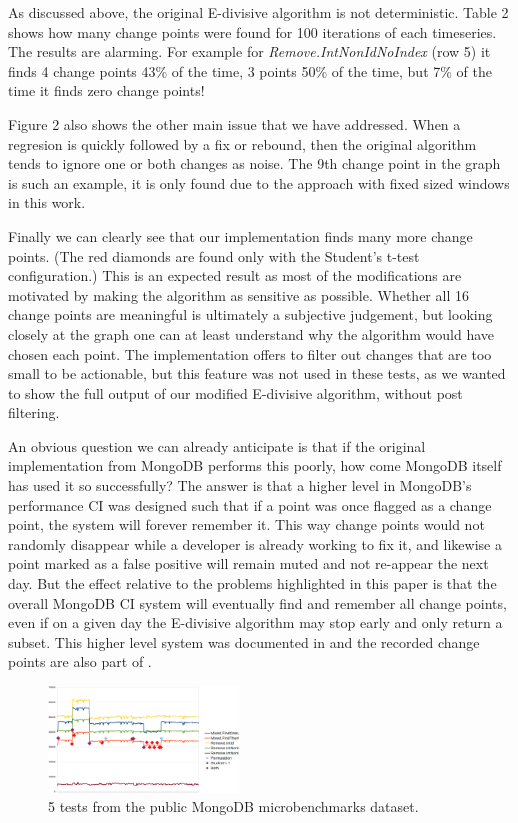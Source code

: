\documentclass[sigconf]{acmart}
\begin{document}
As discussed above, the original E-divisive algorithm is not deterministic. Table 2 shows how many
change points were found for 100 iterations of each timeseries. The results are alarming. For example
for \emph{Remove.IntNonIdNoIndex} (row 5) it finds 4 change points 43\% of the time, 3 points 50\%
of the time, but 7\% of the time it finds zero change points!

Figure 2 also shows the other main issue that we have addressed. When a regresion is quickly followed
by a fix or rebound, then the original algorithm tends to ignore one or both changes as noise. The
9th change point in the graph is such an example, it is only found due to the approach with fixed sized
windows in this work.

Finally we can clearly see that our implementation finds many more change points. (The red diamonds
are found only with the Student's t-test configuration.) This is an expected
result as most of the modifications are motivated by making the algorithm as sensitive as possible.
Whether all 16 change points are meaningful is ultimately a subjective judgement, but looking closely
at the graph one can at least understand why the algorithm would have chosen each point. The implementation
offers to filter out changes that are too small to be actionable, but this feature was not used in
these tests, as we wanted to show the full output of our modified E-divisive algorithm, without post
filtering.

An obvious question we can already anticipate is that if the original implementation from MongoDB
performs this poorly, how come MongoDB itself has used it so successfully? The answer is that
a higher level in MongoDB's performance CI was designed such that if a point was once flagged as a
change point, the system will forever remember it. This way change points would not randomly disappear
while a developer is already working to fix it, and likewise a point marked as a false positive will
remain muted and not re-appear the next day. But the effect relative to the problems highlighted in
this paper is that the overall MongoDB CI system will eventually find and remember all change points,
even if on a given day the E-divisive algorithm may stop early and only return a subset. This higher
level system was documented in \cite{DSI} and the recorded change points are also part of \cite{MONGODATA}.

\begin{figure}
	\includegraphics[width=0.45\textwidth]{mongodb-microbenchmarks}
	\caption{5 tests from the public MongoDB microbenchmarks dataset.}
\end{figure}
\end{document}
